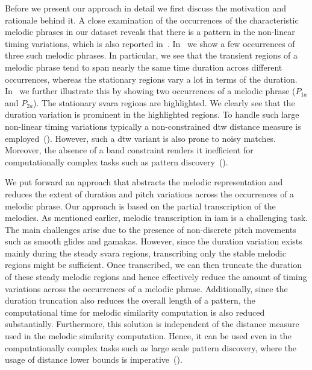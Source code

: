 Before we present our approach in detail we first discuss the motivation and rationale behind it. A close examination of the occurrences of the characteristic melodic phrases in our dataset reveals that there is a pattern in the non-linear timing variations, which is also reported in~\cite{Rao2014}. In~ we show a few occurrences of three such melodic phrases. In particular, we see that the transient regions of a melodic phrase tend to span nearly the same time duration across different occurrences, whereas the stationary regions vary a lot in terms of the duration. In~ we further illustrate this by showing two occurrences of a melodic phrase ($P_{1a}$ and $P_{2a}$). The stationary \gls{svara} regions are highlighted. We clearly see that the duration variation is prominent in the highlighted regions. To handle such large non-linear timing variations typically a non-constrained \gls{dtw} distance measure is employed~(). However, such a \gls{dtw} variant is also prone to noisy matches. Moreover, the absence of a band constraint renders it inefficient for computationally complex tasks such as pattern discovery~().

We put forward an approach that abstracts the melodic representation and reduces the extent of duration and pitch variations across the occurrences of a melodic phrase. Our approach is based on the partial transcription of the melodies.  As mentioned earlier, melodic transcription in \gls{iam} is a challenging task. The main challenges arise due to the presence of non-discrete pitch movements such as smooth glides and \glspl{gamaka}. However, since the duration variation exists mainly during the steady \gls{svara} regions, transcribing only the stable melodic regions might be sufficient. Once transcribed, we can then truncate the duration of these steady melodic regions and hence effectively reduce the amount of timing variations across the occurrences of a melodic phrase. Additionally, since the duration truncation also reduces the overall length of a pattern, the computational time for melodic similarity computation is also reduced substantially. Furthermore, this solution is independent of the distance measure used in the melodic similarity computation. Hence, it can be used even in the computationally complex tasks such as large scale pattern discovery, where the usage of distance lower bounds is imperative~().

